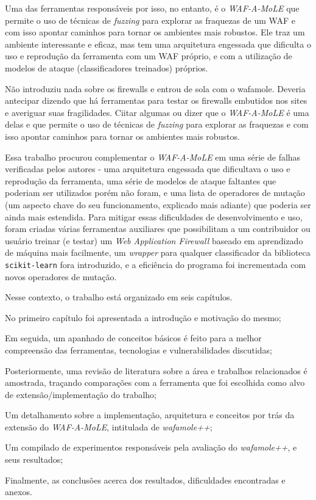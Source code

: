 Uma das ferramentas responsáveis por isso, no entanto, é o \textit{WAF-A-MoLE} \cite{valenza_waf--mole_2020}  que permite o uso de técnicas de \textit{fuzzing} \cite{fuzzing_book} para explorar as fraquezas de um WAF e com isso apontar caminhos para tornar os ambientes mais robustos. Ele traz um ambiente interessante e eficaz, mas tem uma arquitetura engessada que dificulta o uso e reprodução da ferramenta com um WAF próprio, e com a utilização de modelos de ataque (classificadores treinados) próprios. 

Não introduziu nada sobre os firewalls e entrou de sola com o wafamole. Deveria antecipar dizendo que há ferramentas para testar os firewalls embutidos nos sites e averiguar suas fragilidades. Ciitar algumas ou dizer que o \textit{WAF-A-MoLE} \cite{valenza_waf--mole_2020} é uma delas e que permite o uso de técnicas de \textit{fuzzing} \cite{fuzzing_book} para explorar as fraquezas e com isso apontar caminhos para tornar os ambientes mais robustos.

Essa trabalho procurou complementar o \textit{WAF-A-MoLE} em uma série de falhas verificadas pelos autores - uma arquitetura engessada que dificultava o uso e reprodução da ferramenta, uma série de modelos de ataque faltantes que poderiam ser utilizados porém não foram, e uma lista de operadores de mutação (um aspecto chave do seu funcionamento, explicado mais adiante) que poderia ser ainda mais estendida. Para mitigar essas dificuldades de desenvolvimento e uso, foram criadas várias ferramentas auxiliares que possibilitam a um contribuidor ou usuário treinar (e testar) um \textit{Web Application Firewall} baseado em aprendizado de máquina mais facilmente, um \textit{wrapper} para qualquer classificador da biblioteca \verb+scikit-learn+ fora introduzido, e a eficiência do programa foi incrementada com novos operadores de mutação.

Nesse contexto, o trabalho está organizado em seis capítulos. 
\begin{alineas}
\item No primeiro capítulo foi apresentada a introdução e motivação do mesmo; \item Em seguida, um apanhado de conceitos básicos é feito para a melhor compreensão das ferramentas, tecnologias e vulnerabilidades discutidas;
\item Posteriormente, uma revisão de literatura sobre a área e trabalhos relacionados é amostrada, traçando comparações com a ferramenta que foi escolhida como alvo de extensão/implementação do trabalho;
\item Um detalhamento sobre a implementação, arquitetura e conceitos por trás da extensão do \textit{WAF-A-MoLE}, intitulada de \textit{wafamole++};
\item Um compilado de experimentos responsáveis pela avaliação do \textit{wafamole++}, e seus resultados;
\item Finalmente, as conclusões acerca dos resultados, dificuldades encontradas e anexos.
\end{alineas}

\bigskip
